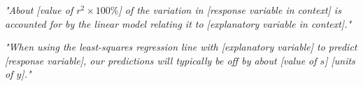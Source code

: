 \begin{templatebox}
\emph{"About [value of $r^2 \times 100\%$] of the variation in [response variable in context] is accounted for by the linear model relating it to [explanatory variable in context]."}
\end{templatebox}

\begin{templatebox}
\emph{"When using the least-squares regression line with [explanatory variable] to predict [response variable], our predictions will typically be off by about [value of $s$] [units of $y$]."}
\end{templatebox}
